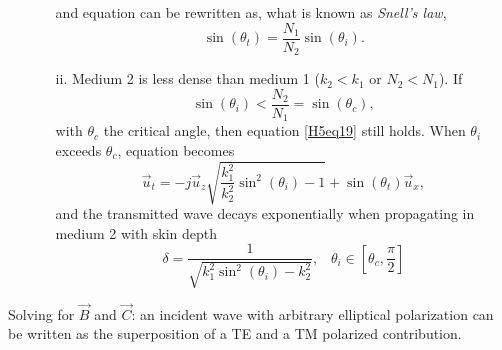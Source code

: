 \documentclass[a4paper, 10pt]{article}
\begin{document}
\begin{itemize}
\begin{itemize}
            and equation  can be rewritten as, what is known as \textit{Snell's law},
            \begin{equation}
                \sin(\theta_t) = \frac{N_1}{N_2}\sin(\theta_i). \label{H5eq20}
            \end{equation}
            \item[ii.] Medium 2 is less dense than medium 1 ($k_2 < k_1$ or $N_2 < N_1$). If 
            \begin{equation}
                \sin(\theta_i) < \frac{N_2}{N_1} = \sin(\theta_c), \label{H5eq21}
            \end{equation}
            with $\theta_c$ the critical angle, then equation \ref{H5eq19} still holds. When $\theta_i$ exceeds $\theta_c$, equation  becomes
            \begin{equation}
                \vec{u}_t = -j\vec{u}_z\sqrt{\frac{k^2_1}{k^2_2}\sin^2(\theta_i)-1} + \sin(\theta_t)\vec{u}_x, \label{H5eq22}
            \end{equation}
            and the transmitted wave decays exponentially when propagating in medium 2 with skin depth
            \begin{equation}
                \delta = \frac{1}{\sqrt{k^2_1\sin^2(\theta_i)-k^2_2}}, \;\;\; \theta_i \in [\theta_c, \frac{\pi}{2}] \label{H5eq23}
            \end{equation}
        \end{itemize}
    \end{itemize}
    Solving for $\vec{B}$ and $\vec{C}$: an incident wave with arbitrary elliptical polarization can be written as the superposition of a TE and a TM polarized contribution. 
\end{document}
